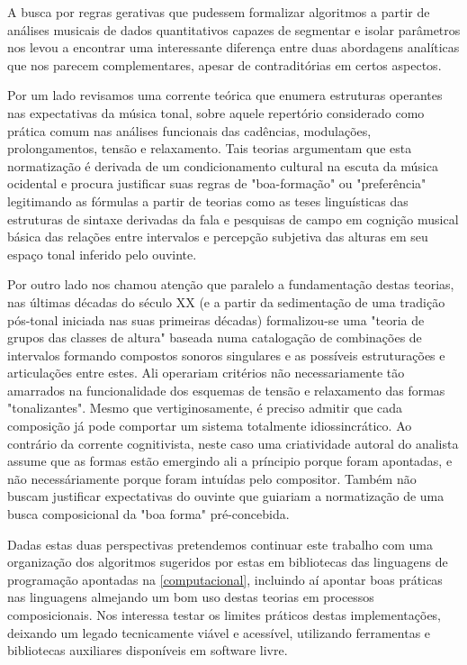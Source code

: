 \documentclass[
	12pt,				%
	openright,			%
	twoside,			%
	a4paper,			%
	english,			%
	french,				%
	spanish,			%
	brazil				%
	]{abntex2}
\begin{document}

A busca por regras gerativas\cite{roads1979grammars} que pudessem formalizar algoritmos a partir de análises musicais de dados quantitativos capazes de segmentar e isolar parâmetros nos levou a encontrar uma interessante diferença entre duas abordagens analíticas que nos parecem complementares, apesar de contraditórias em certos aspectos.

Por um lado revisamos uma corrente teórica que enumera estruturas operantes nas expectativas da música tonal, sobre aquele repertório considerado como prática comum nas análises funcionais das cadências, modulações, prolongamentos, tensão e relaxamento. Tais teorias argumentam que esta normatização é derivada de um condicionamento cultural na escuta da música ocidental e procura justificar suas regras de "boa-formação" ou "preferência"\cite{lerdahl1983generative,temperley2004cognition} legitimando as fórmulas a partir de teorias como as teses linguísticas das estruturas de sintaxe derivadas da fala\cite{chomsky1957syntactic} e pesquisas de campo em cognição musical básica das relações entre intervalos e percepção subjetiva das alturas em seu espaço tonal inferido pelo ouvinte\cite{krumhansl1990cognitive,lerdahl2001tonal}. 

Por outro lado nos chamou atenção que paralelo a fundamentação destas teorias, nas últimas décadas do século XX (e a partir da sedimentação de uma tradição pós-tonal iniciada nas suas primeiras décadas) formalizou-se uma "teoria de grupos das classes de altura"\cite{forte1973structure,rahn1980basic,perle1990pitch,straus2004} baseada numa catalogação de combinações de intervalos formando compostos sonoros singulares e as possíveis estruturações e articulações entre estes. Ali operariam critérios não necessariamente tão amarrados na funcionalidade dos esquemas de tensão e relaxamento das formas "tonalizantes". Mesmo que vertiginosamente, é preciso admitir que cada composição já pode comportar um sistema totalmente idiossincrático. Ao contrário da corrente cognitivista, neste caso uma criatividade autoral do analista assume que as formas estão emergindo ali a príncipio porque foram apontadas, e não necessáriamente porque foram intuídas pelo compositor. Também não buscam justificar expectativas do ouvinte que guiariam a normatização de uma busca composicional da "boa forma" pré-concebida.\cite{babbitt1958cares}

Dadas estas duas perspectivas pretendemos continuar este trabalho com uma organização dos algoritmos sugeridos por estas em bibliotecas das linguagens de programação apontadas na \autoref{computacional}, incluindo aí apontar boas práticas nas linguagens almejando um bom uso destas teorias em processos composicionais. Nos interessa testar os limites práticos destas implementações, deixando um legado tecnicamente viável e acessível, utilizando ferramentas e bibliotecas auxiliares disponíveis em software livre.
\end{document}
